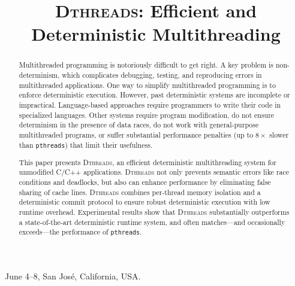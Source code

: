 \documentclass{sigplanconf}
\newcommand{\dthreads}{\textsc{Dthreads}}
\newcommand{\Dthreads}{\textsc{Dthreads}}
\newcommand{\pthreads}{\texttt{pthreads}}
\begin{document}
 {June 4--8, San Jos\'e, California, USA.}

\title{\textsc{Dthreads}: Efficient and Deterministic Multithreading}



\maketitle

\begin{comment}
\end{comment}

\begin{abstract}
Multithreaded programming is notoriously difficult to get right.  A
key problem is non-determinism, which complicates debugging, testing,
and reproducing errors in multithreaded applications. One way to
simplify multithreaded programming is to enforce deterministic
execution. However, past deterministic systems are incomplete
or impractical. Language-based approaches require programmers to write
their code in specialized languages. Other systems require program
modification, do not ensure determinism in the presence of data
races, do not work with general-purpose multithreaded programs, or
suffer substantial performance penalties (up to $8\times$ slower
than \pthreads{}) that limit their usefulness.

This paper presents \dthreads{}, an efficient deterministic
multithreading system for unmodified C/C++ applications. \Dthreads{}
not only prevents semantic errors like race conditions and deadlocks,
but also can enhance performance by eliminating false sharing of cache
lines. \dthreads{} combines per-thread memory isolation and a
deterministic commit protocol to ensure robust deterministic execution
with low runtime overhead. Experimental results show that \dthreads{}
substantially outperforms a state-of-the-art deterministic runtime
system, and often matches---and occasionally exceeds---the performance
of \pthreads{}.
\end{abstract}
\end{document}
